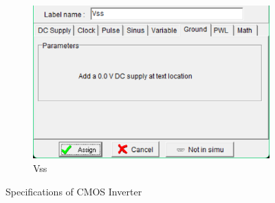 \documentclass[a4paper,12pt]{article}
\begin{document}
\begin{enumerate}
\begin{figure}[H]
\begin{subfigure}[t]{0.32\textwidth}
		\includegraphics[width=1\linewidth]{images/c/vss}
		\caption{Vss}
	\end{subfigure}
		\caption{Specifications of CMOS Inverter }
\end{figure}


\end{enumerate}
\end{document}
